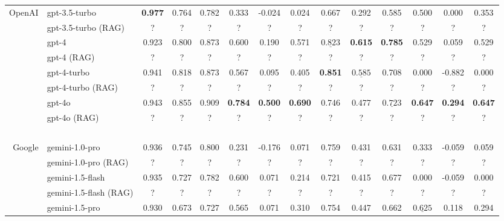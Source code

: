 \begin{table*}[ht]
\begin{tabular}{r|lccc|ccc|ccc|ccc}
        \hline
        OpenAI  & gpt-3.5-turbo          & \textbf{0.977} & 0.764  & 0.782 & 0.333 & -0.024 & 0.024 & 0.667 & 0.292 & 0.585 & 0.500 & 0.000  & 0.353 \\ 
        ~       & gpt-3.5-turbo (RAG)    & ?              & ?      & ?     & ?     & ?      & ?     & ?     & ?     & ?     & ?     & ?      & ?     \\ 
        ~       & gpt-4                  & 0.923 & 0.800  & 0.873 & 0.600 & 0.190  & 0.571 & $\underline{0.823}$ & \textbf{0.615} & \textbf{0.785} & 0.529 & 0.059  & 0.529  \\ 
        ~       & gpt-4 (RAG)            & ?              & ?      & ?     & ?     & ?      & ?     & ?     & ?     & ?     & ?     & ?      & ?     \\ 
        ~       & gpt-4-turbo            & 0.941 & 0.818  & 0.873 & 0.567 & 0.095  & 0.405 & \textbf{0.851} & $\underline{0.585}$ & 0.708 & 0.000 & -0.882 & 0.000  \\
        ~       & gpt-4-turbo (RAG)      & ?              & ?      & ?     & ?     & ?      & ?     & ?     & ?     & ?     & ?     & ?      & ?     \\ 
        ~       & gpt-4o                 & 0.943 & 0.855  & 0.909 & \textbf{0.784} & \textbf{0.500}  & \textbf{0.690} & 0.746 & 0.477 & $\underline{0.723}$ & \textbf{0.647} & \textbf{0.294}  & \textbf{0.647}  \\ 
        ~       & gpt-4o (RAG)           & ?              & ?      & ?     & ?     & ?      & ?     & ?     & ?     & ?     & ?     & ?      & ?     \\ 
        ~       & ~                      & ~ & ~ & ~ & ~  & ~ & ~ & ~ & ~ & ~ & ~  & ~ & ~ \\
        Google  & gemini-1.0-pro         & 0.936 & 0.745  & 0.800 & 0.231 & -0.176 & 0.071 & 0.759 & 0.431 & 0.631 & 0.333 & -0.059 & 0.059\\ 
        ~       & gemini-1.0-pro (RAG)   & ?              & ?      & ?     & ?     & ?      & ?     & ?     & ?     & ?     & ?     & ?      & ?     \\ 
        ~       & gemini-1.5-flash       & 0.935 & 0.727  & 0.782 & 0.600 & 0.071  & 0.214 & 0.721 & 0.415 & 0.677 & 0.000 & -0.059 & 0.000\\ 
        ~       & gemini-1.5-flash (RAG) & ?              & ?      & ?     & ?     & ?      & ?     & ?     & ?     & ?     & ?     & ?      & ?     \\ 
        ~       & gemini-1.5-pro         & 0.930 & 0.673  & 0.727 & 0.565 & 0.071  & 0.310 & 0.754 & 0.447 & 0.662 & $\underline{0.625}$ & 0.118  & 0.294\\ 

\end{tabular}
\end{table*}
